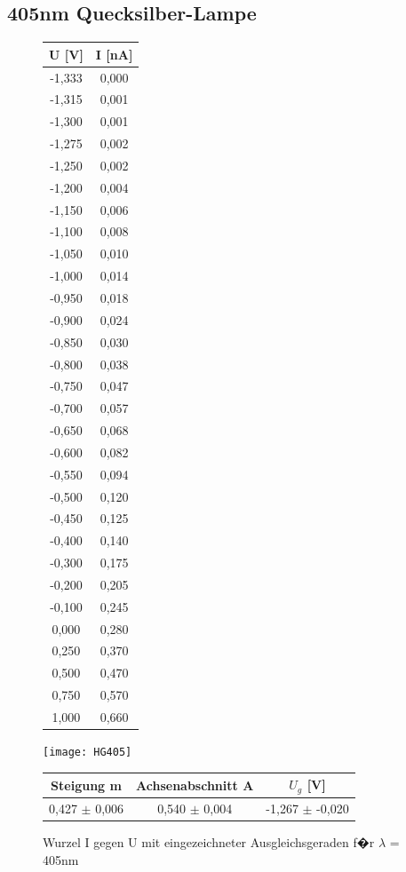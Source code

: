 \documentclass[a4paper, 10pt]{report}%
\begin{document}
\subsection{405nm Quecksilber-Lampe}
\begin{figure}[!htbp]
\begin{minipage}[t]{2cm}
\vspace{0pt}
\centering
\begin{center}
\begin{tabular}{c|c}
U [V] & I [nA] \\
\hline
-1,333&	0,000 \\
-1,315&	0,001 \\
-1,300&	0,001 \\
-1,275&	0,002 \\
-1,250&	0,002 \\
-1,200&	0,004 \\
-1,150&	0,006 \\
-1,100&	0,008 \\
-1,050&	0,010 \\
-1,000&	0,014 \\
-0,950&	0,018 \\
-0,900&	0,024 \\
-0,850&	0,030 \\
-0,800&	0,038 \\
-0,750&	0,047 \\
-0,700&	0,057 \\
-0,650&	0,068 \\
-0,600&	0,082 \\
-0,550&	0,094 \\
-0,500&	0,120 \\
-0,450&	0,125 \\
-0,400&	0,140 \\
-0,300&	0,175 \\
-0,200&	0,205 \\
-0,100&	0,245 \\
0,000&	0,280 \\
0,250&	0,370 \\
0,500&	0,470 \\
0,750&	0,570 \\
1,000&	0,660
\end{tabular}
\end{center}
\end{minipage}
\hfill
\begin{minipage}[t]{12cm}
\vspace{0pt}
\texttt{[image: HG405]}
\caption{Wurzel I gegen U mit eingezeichneter Ausgleichsgeraden f�r $\lambda$ = 405nm}
\begin{center}
\begin{tabular}{c|c|c}
Steigung m & Achsenabschnitt A & $U_g$ [V]\\
\hline
0,427 $\pm$ 0,006 & 0,540 $\pm$	0,004 & -1,267 $\pm$ -0,020
\end{tabular}
\end{center}
\end{minipage}
\end{figure}
\end{document}

